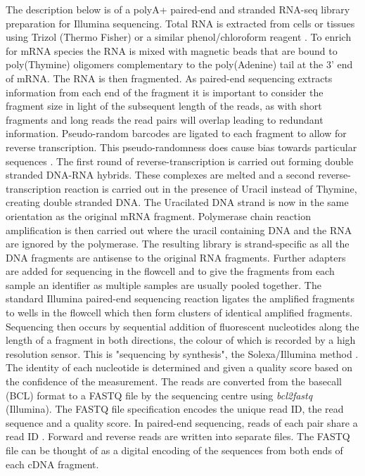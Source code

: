 The description below is of a polyA+ paired-end and  stranded RNA-seq library preparation for Illumina sequencing.
Total RNA is extracted from cells or tissues using Trizol (Thermo Fisher) or a similar phenol/chloroform reagent \citep{Chomczynski1987}. 
To enrich for mRNA species the RNA is mixed with magnetic beads that are bound to poly(Thymine) oligomers complementary to the poly(Adenine) tail at the 3' end of mRNA. 
The RNA is then fragmented. 
As paired-end sequencing extracts information from each end of the fragment it is important to consider the fragment size in light of the subsequent length of the reads, as with short fragments and long reads the read pairs will overlap leading to redundant information. 
Pseudo-random barcodes are ligated to each fragment to allow for reverse transcription. 
This pseudo-randomness does cause bias towards particular sequences \citep{VanGurp2013}.
The first round of reverse-transcription is carried out forming double stranded DNA-RNA hybrids. 
These complexes are melted and a second reverse-transcription reaction is carried out in the presence of Uracil instead of Thymine, creating double stranded DNA. The Uracilated DNA strand is now in the same orientation as the original mRNA fragment. 
Polymerase chain reaction amplification is then carried out where the uracil containing DNA and the RNA are ignored by the polymerase. 
The resulting library is strand-specific as all the DNA fragments are antisense to the original RNA fragments. Further adapters are added for sequencing in the flowcell and to give the fragments from each sample an identifier as multiple samples are usually pooled together. 
The standard Illumina paired-end sequencing reaction ligates the amplified fragments to wells in the flowcell which then form clusters of identical amplified fragments. 
Sequencing then occurs by sequential addition of fluorescent nucleotides along the length of a fragment in both directions, the  colour of which is recorded by a high resolution sensor. 
This is "sequencing by synthesis", the Solexa/Illumina method \citep{Bentley2008}.
The identity of each nucleotide is determined and given a quality score based on the confidence of the measurement. 
The reads are converted from the basecall (BCL) format to a FASTQ file by the sequencing centre using \textit{bcl2fastq} (Illumina).
The FASTQ file specification \citep{Cock2009} encodes the unique read ID, the read sequence and a quality score. In paired-end sequencing, reads of each pair share a read ID . 
Forward and reverse reads are written into separate files.  
The FASTQ file can be thought of as a digital encoding of the sequences from both ends of each cDNA fragment.

